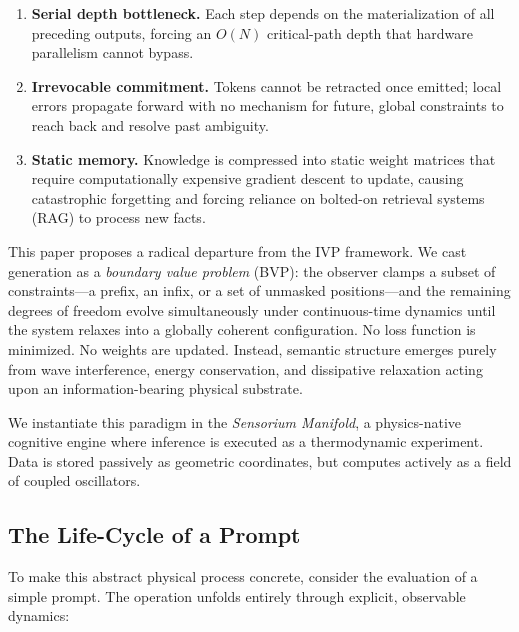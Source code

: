 \documentclass[11pt,a4paper]{article}
\begin{document}
\begin{enumerate}[nosep]
  \item \textbf{Serial depth bottleneck.} Each step depends on the materialization of all preceding outputs, forcing an $O(N)$ critical-path depth that hardware parallelism cannot bypass.
  \item \textbf{Irrevocable commitment.} Tokens cannot be retracted once emitted; local errors propagate forward with no mechanism for future, global constraints to reach back and resolve past ambiguity.
  \item \textbf{Static memory.} Knowledge is compressed into static weight matrices that require computationally expensive gradient descent to update, causing catastrophic forgetting and forcing reliance on bolted-on retrieval systems (RAG) to process new facts.
\end{enumerate}

This paper proposes a radical departure from the IVP framework. We cast generation as a \emph{boundary value problem} (BVP): the observer clamps a subset of constraints—a prefix, an infix, or a set of unmasked positions—and the remaining degrees of freedom evolve simultaneously under continuous-time dynamics until the system relaxes into a globally coherent configuration. No loss function is minimized. No weights are updated. Instead, semantic structure emerges purely from wave interference, energy conservation, and dissipative relaxation acting upon an information-bearing physical substrate.

We instantiate this paradigm in the \emph{Sensorium Manifold}, a physics-native cognitive engine where inference is executed as a thermodynamic experiment. Data is stored passively as geometric coordinates, but computes actively as a field of coupled oscillators. 

\subsection{The Life-Cycle of a Prompt}
\label{sec:life_of_prompt}
To make this abstract physical process concrete, consider the evaluation of a simple prompt. The operation unfolds entirely through explicit, observable dynamics:
\end{document}
